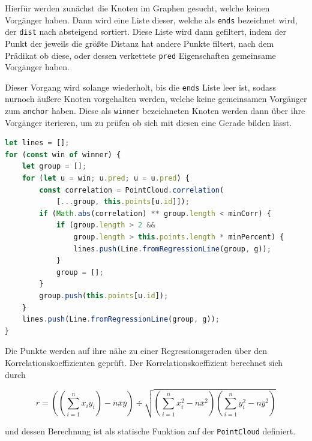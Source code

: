 Hierfür werden zunächst die Knoten im Graphen gesucht, welche keinen Vorgänger haben.
Dann wird eine Liste dieser, welche als \lstinline{ends} bezeichnet wird, der \lstinline{dist} nach absteigend sortiert.
Diese Liste wird dann gefiltert, indem der Punkt der jeweils die grö{\ss}te Distanz hat andere Punkte filtert, nach dem Prädikat ob diese, oder dessen verkettete \lstinline{pred} Eigenschaften gemeinsame Vorgänger haben.

Dieser Vorgang wird solange wiederholt, bis die \lstinline{ends} Liste leer ist, sodass nurnoch äu{\ss}ere Knoten vorgehalten werden, welche keine gemeinsamen Vorgänger zum \lstinline{anchor} haben.
Diese als \lstinline{winner} bezeichneten Knoten werden dann über ihre Vorgänger iterieren, um zu prüfen ob sich mit diesen eine Gerade bilden lässt.

\begin{lstlisting}[language=JavaScript, caption={Bestimmung der äu{\ss}ersten Knoten zur Bestimmung von Geraden durch den Korrelationskoeffizienten in der \lstinline{groupsByCorrelation} Funktion innerhalb der \lstinline{Dijkstra} Klasse.}, label={lst:dijkstra_correlation_part2}]
let lines = [];
for (const win of winner) {
    let group = [];
    for (let u = win; u.pred; u = u.pred) {
        const correlation = PointCloud.correlation(
            [...group, this.points[u.id]]);
        if (Math.abs(correlation) ** group.length < minCorr) {
            if (group.length > 2 &&
                group.length > this.points.length * minPercent) {
                lines.push(Line.fromRegressionLine(group, g));
            }
            group = [];
        }
        group.push(this.points[u.id]);
    }
    lines.push(Line.fromRegressionLine(group, g));
}
\end{lstlisting}

Die Punkte werden auf ihre nähe zu einer Regressionsgeraden über den Korrelationskoeffizienten geprüft.
Der Korrelationskoeffizient berechnet sich durch~\cite{Papula2014}

\begin{equation}
    r = \left(\left(\sum_{i=1}^n x_i y_i\right) - n \bar{x} \bar{y}\right) \div \sqrt{\left(\sum_{i=1}^n x_i^2 - n\bar{x}^2\right)\left(\sum_{i=1}^n y_i^2 - n \bar{y}^2\right)}
    \label{eq:korrelationskoeffizient}
\end{equation}

und dessen Berechnung ist als statische Funktion auf der \lstinline{PointCloud} definiert.

